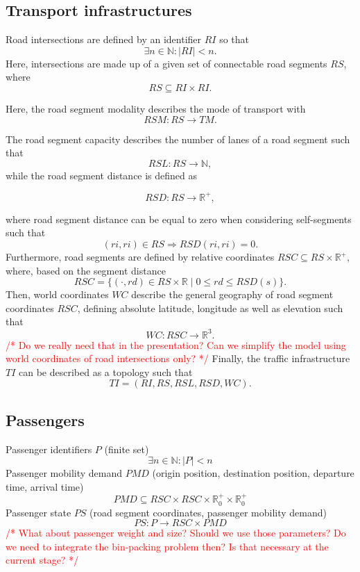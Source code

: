\documentclass[conference]{IEEEtran}
\newcommand{\todo}[1]{\textcolor{red}{/* #1 */}}
\begin{document}
	\subsection{Transport infrastructures}
	\label{transport}
	Road intersections are defined by an identifier $RI$ so that
	\[
	\exists n \in \mathbb{N} : |RI| < n \mathrm{.}
	\]
	Here, intersections are made up of a given set of connectable road segments $RS$, where
	\[
	RS \subseteq RI \times RI \mathrm{.}
	\]
	
	Here, the road segment modality describes the mode of transport with
	\[
	RSM : RS \to TM \mathrm{.}
	\]
	
	The road segment capacity describes the number of lanes of a road segment such that
	\[
	RSL : RS \rightarrow \mathbb{N} \mathrm{,}
	\]
	while the road segment distance is defined as 
	
	\[
	RSD : RS \rightarrow \mathbb{R}^+ \mathrm{,}
	\]
	
	where road segment distance can be equal to zero when considering self-segments such that
	\[
	(ri, ri) \in RS \Rightarrow  RSD(ri, ri) = 0 \mathrm{.}
	\]
	Furthermore, road segments are defined by relative coordinates $RSC \subseteq RS \times \mathbb{R}^+ \mathrm{,}$ where, based on the segment distance
	\[
	RSC = \{(\cdot, rd) \in RS \times \mathbb{R} \mid 0 \leq rd \leq RSD(s) \} \mathrm{.}
	\]
	Then, world coordinates $WC$ describe the general geography of road segment coordinates $RSC$, defining absolute latitude, longitude as well as elevation such that
	\[
	WC : RSC \rightarrow \mathbb{R}^3 \mathrm{.}
	\]
 \todo{Do we really need that in the presentation? Can we simplify the model using world coordinates of road intersections only?}
	Finally, the traffic infrastructure $TI$ can be described as a topology such that 
	\[
	TI = (RI, RS, RSL, RSD, WC) \mathrm{.}
	\]
	
	\subsection{Passengers}
	\label{passengers}
	
	Passenger identifiers $P$ (finite set)
	\[
	\exists n \in \mathbb{N} : |P| < n
	\]
	Passenger mobility demand $PMD$ (origin position, destination position, departure time, arrival time)
	\[
		PMD \subseteq RSC \times RSC \times \mathbb{R}_0^+ \times \mathbb{R}_0^+
	\]
	Passenger state $PS$ (road segment coordinates, passenger mobility demand)
	\[
		PS : P \rightarrow RSC \times PMD
	\]
	\todo{What about passenger weight and size? Should we use those parameters? Do we need to integrate the bin-packing problem then? Is that necessary at the current stage?}
	
\end{document}
